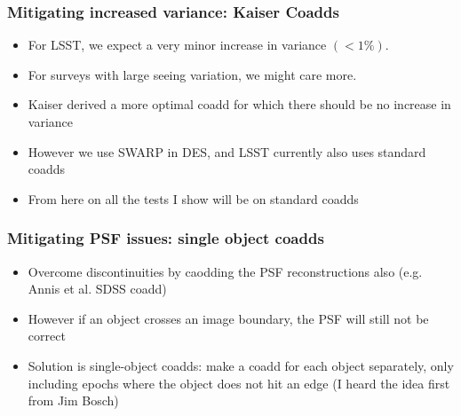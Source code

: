 \documentclass{beamer}
\begin{document}
\frame
{
    \frametitle{Mitigating increased variance: Kaiser Coadds}

    \begin{itemize}

        \item For LSST, we expect a very minor increase in variance $(< 1\%)$.

        \item For surveys with large seeing variation, we might care more.

        \item Kaiser derived a more optimal coadd for which there should be no
            increase in variance

        \item However we use SWARP in DES, and LSST currently also uses
            standard coadds

        \item From here on all the tests I show will be on standard coadds

    \end{itemize}

}



\frame
{
    \frametitle{Mitigating PSF issues: single object coadds}

    \begin{itemize}

        \item Overcome discontinuities by caodding the PSF reconstructions also (e.g. Annis et al. SDSS coadd)

        \item However if an object crosses an image boundary, the PSF will still not be correct

        \item Solution is single-object coadds: make a coadd for each object
            separately, only including epochs where the object does not hit an
            edge (I heard the idea first from Jim Bosch)


    \end{itemize}

}
\end{document}
